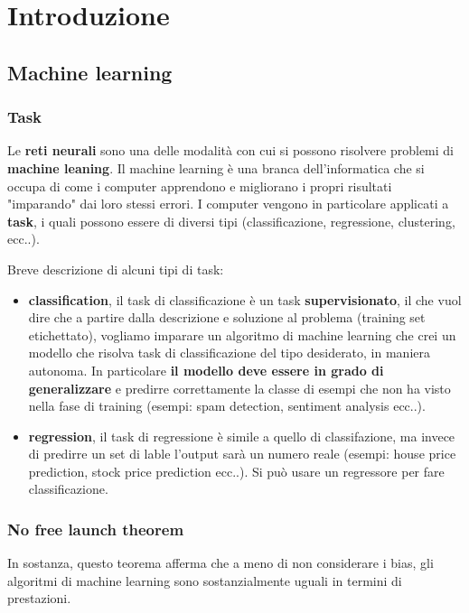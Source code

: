  \chapter{Introduzione}
\section{Machine learning}

\subsection{Task}
Le \textbf{reti neurali} sono una delle modalità con cui si possono risolvere problemi di \textbf{machine leaning}. Il machine learning è una branca dell'informatica che si occupa di come i computer apprendono e migliorano i propri risultati "imparando" dai loro stessi errori. I computer vengono in particolare applicati a \textbf{task}, i quali possono essere di diversi tipi (classificazione, regressione, clustering, ecc..).

Breve descrizione di alcuni tipi di task:

\begin{itemize}
    \item \textbf{classification}, il task di classificazione è un task \textbf{supervisionato}, il che vuol dire che a partire dalla descrizione e soluzione al problema (training set etichettato), vogliamo imparare un algoritmo di machine learning che crei un modello che risolva task di classificazione del tipo desiderato, in maniera autonoma. In particolare \textbf{il modello deve essere in grado di generalizzare} e predirre correttamente la classe di esempi che non ha visto nella fase di training (esempi: spam detection, sentiment analysis ecc..).
    \item \textbf{regression}, il task di regressione è simile a quello di classifazione, ma invece di predirre un set di lable l'output sarà un numero reale (esempi: house price prediction, stock price prediction ecc..). Si può usare un regressore per fare classificazione.
\end{itemize}


\subsection{No free launch theorem}
In sostanza, questo teorema afferma che a meno di non considerare i bias, gli algoritmi di machine learning sono sostanzialmente uguali in termini di prestazioni.


